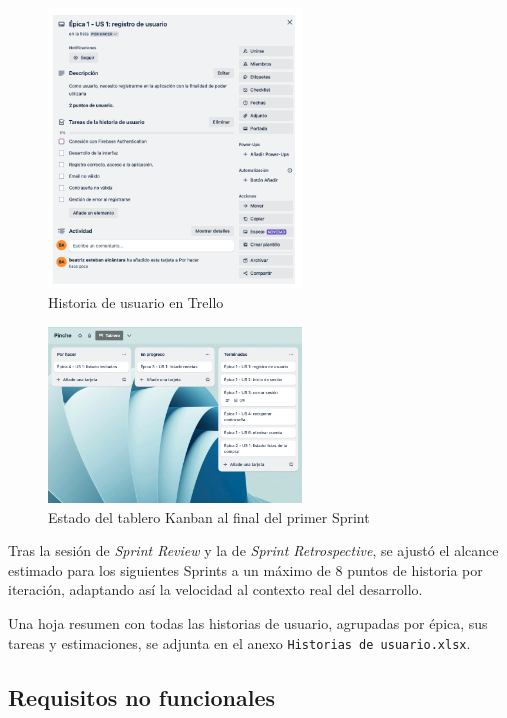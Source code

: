 \begin{figure}[H]
\centering
\includegraphics[width=0.6\textwidth]{./img/requirements/user_story_trello.png}
\caption{Historia de usuario en Trello}
\label{fig:user_story_trello}
\end{figure}

\begin{figure}[H]
\centering
\includegraphics[width=0.6\textwidth]{./img/requirements/final_sprint_trello.png}
\caption{Estado del tablero Kanban al final del primer Sprint}
\label{fig:final_sprint_trello}
\end{figure}

Tras la sesión de \textit{Sprint Review} y la de \textit{Sprint Retrospective}, se ajustó el alcance estimado para los siguientes Sprints a un máximo de 8 puntos de historia por iteración, adaptando así la velocidad al contexto real del desarrollo.

Una hoja resumen con todas las historias de usuario, agrupadas por épica, sus tareas y estimaciones, se adjunta en el anexo \texttt{Historias de usuario.xlsx}.

\subsection{Requisitos no funcionales}

